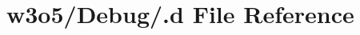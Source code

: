 \hypertarget{w3o5_2_debug_2_8d}{}\section{w3o5/\+Debug/.d File Reference}
\label{w3o5_2_debug_2_8d}
